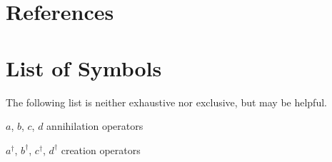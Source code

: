 \documentclass[titlesmallcaps,copyrightpage,examinerscopy]{uomthesis}
\begin{document}
\chapter{References}
\newpage


\appendix



\backmatter

\chapter{List of Symbols}


The following list is neither exhaustive nor exclusive, but may be helpful.
\begin{list}{}{%
\setlength{\labelwidth}{24mm}
\setlength{\leftmargin}{35mm}}
\item[$a$, $b$, $c$, $d$\dotfill] annihilation operators
\item[$a^\dagger$, $b^\dagger$, $c^\dagger$, $d^\dagger$\dotfill] creation
operators
\end{list}
\end{document}
